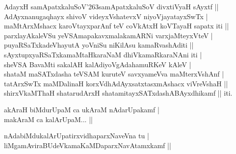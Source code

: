 \begin{entry}
\begin{shl}
AdayxH samApatxkaluSoV{\char'263}samApatxkaluSoV divxtiVyaH sAyxtf ||\\[1pt]
AdAyxnanugaqhayx shivoV videyxVshatevxV niyoVjayatayxSwTx |\\[1pt]
maMtArxMshacx karoVtayxparAnf teV coVkAtxH koVTayaH sapatx iti ||\\[1pt]
parxlayAkaleVSu yeVSAmapakavxmalakamARNi varxjaMteyxVteV |\\[1pt]
puyaRSaTxkadeVhayutA yoVniSu niKilAsu kamaRvashAditi ||\\[1pt]
sAyxtupxyaRSaTxkamaMtaHkaraNaM dhiVkamaRkaraNAni iti |\\[1pt]
sheVSA BavaMti sakalAH kalAdiyoVgAdahamuRKeV kAleV |\\[1pt]
shataM maSATxdasha teVSAM kuruteV savxyameVva maMterxVshAnf |\\[1pt]
tatArxSwTx maMDalinaH korxVdhAdAyxsatxtasxmAshacx viVreVshaH ||\\[1pt]
shirxVkaMThaH shatarudArxH shatamitayxSATxdashABAyxdhikamf || iti.
\end{shl}
\medskip
{}
\smallskip
{}
\smallskip
{}
\end{entry}

\begin{entry}
\smallskip
\begin{shl}
akAraH biMdurUpaM ca ukAraM nAdarUpakamf |\\[1pt]
makAraM ca kalArUpaM... ||
\end{shl}
\medskip
{}
\smallskip
\begin{shl}
nAdabiMdukalArUpatirxvidhaparxNaveVna tu |\\[1pt]
liMgamAviraBUdeVkamaKaMDaparxNavAtamxkamf ||
\end{shl}
\medskip
{}
\smallskip
{}
\end{entry}


